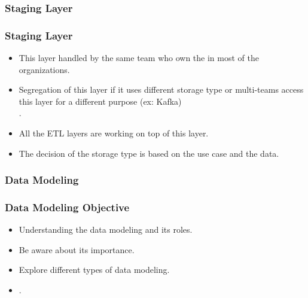 
\subsubsection{Staging Layer}

\begin{frame}
\frametitle{Staging Layer}
\begin{itemize}[<+->]
	\item This layer handled by the same team who own the  in most of the organizations. 
	\item Segregation of this layer if it uses different storage type or multi-teams access this layer for a different purpose (ex: Kafka)\\ .
	\item All the ETL layers are working on top of this layer.
	\item The decision of the storage type is based on the use case and the data.
	
\end{itemize}

\end{frame}


\subsubsection{Data Modeling}


\begin{frame}
\frametitle{Data Modeling Objective}
\begin{itemize}[<+->]
	\item Understanding the data modeling and its roles.
	\item Be aware about its importance.
	\item Explore different types of data modeling.
	\item {}.

\end{itemize}

\end{frame}

